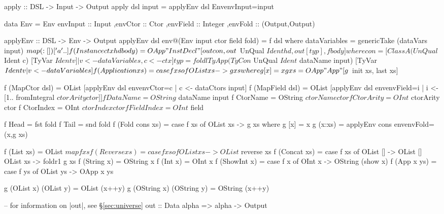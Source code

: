 \documentclass[preprint]{sigplanconf}
\begin{document}
\begin{code}
apply :: DSL -> Input -> Output
apply dsl input = applyEnv dsl Env{envInput=input}


data Env = Env
    {envInput :: Input
    ,envCtor :: Ctor
    ,envField :: Integer
    ,envFold :: (Output,Output)
    }

applyEnv :: DSL -> Env -> Output
applyEnv dsl env@(Env input ctor field fold) = f dsl
    where
        dataVariables = genericTake (dataVars input) $ map (:[]) ['a'..]

        f (Instance ctx hd body) =
                OApp "InstDecl" [out con, out $ UnQual $ Ident hd, out [typ], f body]
            where
                con = [ClassA (UnQual $ Ident c) [TyVar $ Ident v] | v <- dataVariables, c <- ctx]
                typ = foldl TyApp (TyCon $ UnQual $ Ident $ dataName input) [TyVar $ Ident v | v <- dataVariables]

        f (Application xs) = case f xs of
            OList xs -> g xs
            where g [x] = x
                  g xs = OApp "App" [g $ init xs, last xs]

        f (MapCtor dsl) = OList [applyEnv dsl env{envCtor=c} | c <- dataCtors input]
        f (MapField dsl) = OList [applyEnv dsl env{envField=i} | i <- [1.. fromIntegral $ ctorArity ctor]]

        f DataName = OString $ dataName input
        f CtorName = OString $ ctorName ctor
        f CtorArity = OInt $ ctorArity ctor
        f CtorIndex = OInt $ ctorIndex ctor
        f FieldIndex = OInt $ field

        f Head = fst fold
        f Tail = snd fold
        f (Fold cons xs) = case f xs of OList xs -> g xs
            where g [x] = x
                  g (x:xs) = applyEnv cons env{envFold=(x,g xs)}

        f (List xs) = OList $ map f xs
        f (Reverse xs) = case f xs of
            OList xs -> OList $ reverse xs
        f (Concat xs) = case f xs of
            OList [] -> OList []
            OList xs -> foldr1 g xs
        f (String x) = OString x
        f (Int x) = OInt x
        f (ShowInt x) = case f x of OInt x -> OString (show x)
        f (App x ys) = case f ys of
            OList ys -> OApp x ys

        g (OList x) (OList y) = OList (x++y)
        g (OString x) (OString y) = OString (x++y)

-- for information on |out|, see \S\ref{sec:universe}
out :: Data alpha => alpha -> Output
\end{code}
\end{document}
